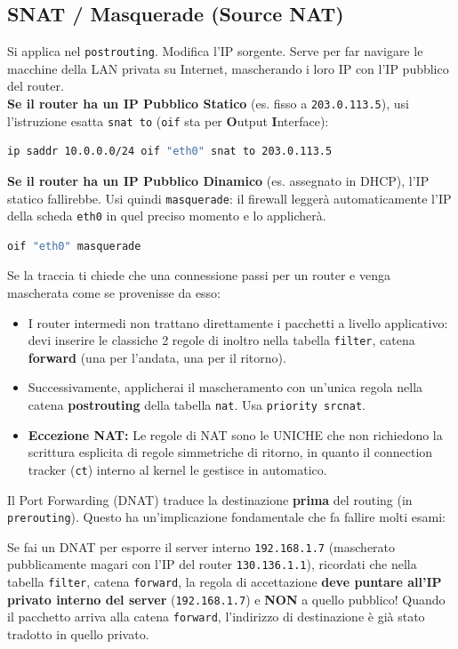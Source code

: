 \documentclass[12pt,a4paper]{report}
\begin{document}
	\subsection{SNAT / Masquerade (Source NAT)}
	Si applica nel \texttt{postrouting}. Modifica l'IP sorgente. Serve per far navigare le macchine della LAN privata su Internet, mascherando i loro IP con l'IP pubblico del router.\\
	\textbf{Se il router ha un IP Pubblico Statico} (es. fisso a \texttt{203.0.113.5}), usi l'istruzione esatta \texttt{snat to} (\texttt{oif} sta per \textbf{O}utput \textbf{I}nterface):
	\begin{lstlisting}[language=bash]
		ip saddr 10.0.0.0/24 oif "eth0" snat to 203.0.113.5
	\end{lstlisting}
	\textbf{Se il router ha un IP Pubblico Dinamico} (es. assegnato in DHCP), l'IP statico fallirebbe. Usi quindi \texttt{masquerade}: il firewall leggerà automaticamente l'IP della scheda \texttt{eth0} in quel preciso momento e lo applicherà.
	\begin{lstlisting}[language=bash]
		oif "eth0" masquerade
	\end{lstlisting}
	
	\begin{nota}
		Se la traccia ti chiede che una connessione passi per un router e venga mascherata come se provenisse da esso:
		\begin{itemize}
			\item I router intermedi non trattano direttamente i pacchetti a livello applicativo: devi inserire le classiche 2 regole di inoltro nella tabella \texttt{filter}, catena \textbf{forward} (una per l'andata, una per il ritorno).
			\item Successivamente, applicherai il mascheramento con un'unica regola nella catena \textbf{postrouting} della tabella \texttt{nat}. Usa \texttt{priority srcnat}.
			\item \textbf{Eccezione NAT:} Le regole di NAT sono le UNICHE che non richiedono la scrittura esplicita di regole simmetriche di ritorno, in quanto il connection tracker (\texttt{ct}) interno al kernel le gestisce in automatico.
		\end{itemize}
	\end{nota}
	
	\begin{nota}
		Il Port Forwarding (DNAT) traduce la destinazione \textbf{prima} del routing (in \texttt{prerouting}). Questo ha un'implicazione fondamentale che fa fallire molti esami:
		
		Se fai un DNAT per esporre il server interno \texttt{192.168.1.7} (mascherato pubblicamente magari con l'IP del router \texttt{130.136.1.1}), ricordati che nella tabella \texttt{filter}, catena \texttt{forward}, la regola di accettazione \textbf{deve puntare all'IP privato interno del server} (\texttt{192.168.1.7}) e \textbf{NON} a quello pubblico! Quando il pacchetto arriva alla catena \texttt{forward}, l'indirizzo di destinazione è già stato tradotto in quello privato.
	\end{nota}
	
\end{document}

